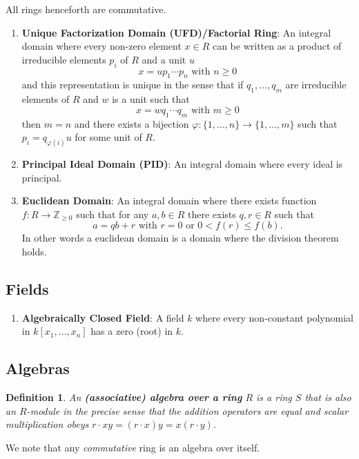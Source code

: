 \documentclass{report}
\providecommand{\Z}{\mathbb{Z}}
\newtheorem{defi}{Definition}
\begin{document}
  
  All rings henceforth are commutative.
  \begin{enumerate}
  \item[] \textbf{Unique Factorization Domain (UFD)/Factorial Ring}: An integral domain where every non-zero element $x\in R$ can be written as a product of irreducible elements $p_i$ of $R$ and a unit $u$
    \[
      x =  up_1\cdots p_n \text{ with } n\geq 0
    \]
    and this representation is unique in the sense that if $q_1,\ldots,q_m$ are irreducible elements of $R$ and $w$ is a unit such that
    \[
      x = wq_1\cdots q_m \text{ with } m\geq 0
    \]
    then $m=n$ and there exists a bijection $\varphi:\{1,\ldots, n\}\to \{1,\ldots, m\}$ such that $p_i=q_{\varphi(i)} u$ for some unit of $R$.

  \item[] \textbf{Principal Ideal Domain (PID)}: An integral domain where every ideal is principal.
    
  \item[] \textbf{Euclidean Domain}: An integral domain where there exists function $f:R\to \Z_{\geq 0}$ such that for any $a,b\in R$ there exists $q,r\in R$ such that
    \[
      a=qb+r \text{ with } r=0 \text{ or } 0<f(r)\leq f(b).
    \]
    In other words a euclidean domain is a domain where the division theorem holds.
  \end{enumerate}
  
    \subsection{Fields}
    \begin{enumerate}
    \item[] \textbf{Algebraically Closed Field}: A field $k$ where every non-constant polynomial in $k[x_1,\ldots,x_n]$ has a zero (root) in $k$.
    \end{enumerate}

    \subsection{Algebras}
    \begin{defi}
      An \textbf{(associative) algebra over a ring} $R$ is a ring $S$ that is also an $R$-module in the precise sense that the addition operators are equal and scalar multiplication obeys $r\cdot xy=(r\cdot x)y=x(r\cdot y)$.
    \end{defi}
    We note that any \textit{commutative} ring is an algebra over itself.
    
\end{document}
